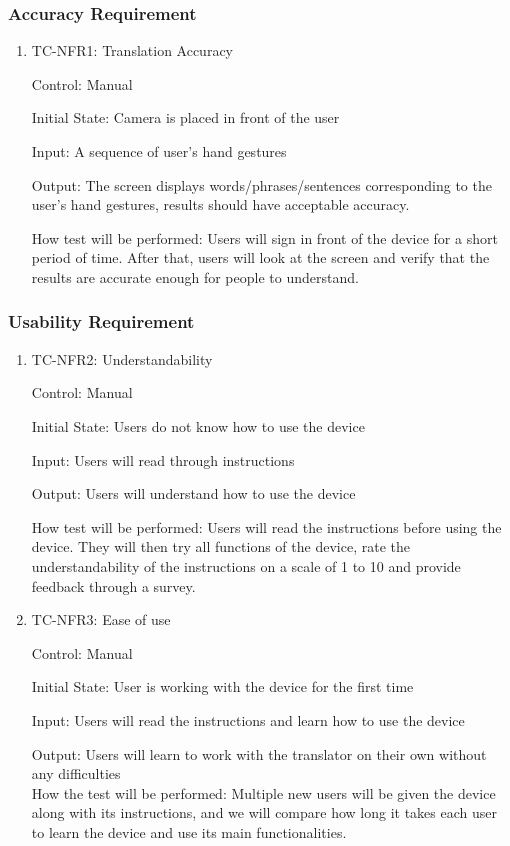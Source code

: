 \documentclass[12pt]{article}
\begin{document}
\subsubsection{Accuracy Requirement}

\begin{enumerate}

\item{TC-NFR1: Translation Accuracy\\}

Control: Manual
					
Initial State: Camera is placed in front of the user
					
Input: A sequence of user’s hand gestures
					
Output: The screen displays words/phrases/sentences corresponding to the user's hand gestures, results should have acceptable accuracy.
					
How test will be performed: Users will sign in front of the device for a short period of time. After that, users will look at the screen and verify that the results are accurate enough for people to understand.

\end{enumerate}

\subsubsection{Usability Requirement}

\begin{enumerate}

\item{TC-NFR2: Understandability\\}

Control: Manual
					
Initial State: Users do not know how to use the device
					
Input: Users will read through instructions
					
Output: Users will understand how to use the device
					
How test will be performed: Users will read the instructions before using the device. They will then try all functions of the device, rate the understandability of the instructions on a scale of 1 to 10 and provide feedback through a survey.

\item{TC-NFR3: Ease of use\\}

Control: Manual
					
Initial State: User is working with the device for the first time
					
Input: Users will read the instructions and learn how to use the device
					
Output: Users will learn to work with the translator on their own without any difficulties\\
How the test will be performed: Multiple new users will be given the device along with its instructions, and we will compare how long it takes each user to learn the device and use its main functionalities.
					


\end{enumerate}
\end{document}
